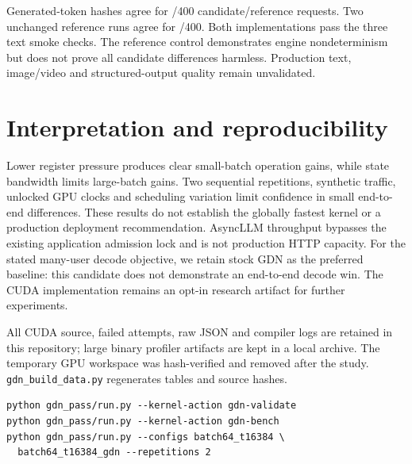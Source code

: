 \documentclass[10pt,a4paper]{article}
\begin{document}
Generated-token hashes agree for \TokenAgree{}/400 candidate/reference requests.
Two unchanged reference runs agree for \ControlAgree{}/400. Both implementations
pass the three text smoke checks. The reference control demonstrates engine
nondeterminism but does not prove all candidate differences harmless. Production
text, image/video and structured-output quality remain unvalidated.

\section{Interpretation and reproducibility}
Lower register pressure produces clear small-batch operation gains, while state
bandwidth limits large-batch gains. Two sequential repetitions, synthetic traffic,
unlocked GPU clocks and scheduling variation limit confidence in small end-to-end
differences. These results do not establish the globally fastest kernel or a
production deployment recommendation. AsyncLLM throughput bypasses the existing
application admission lock and is not production HTTP capacity.
For the stated many-user decode objective, we retain stock GDN as the preferred
baseline: this candidate does not demonstrate an end-to-end decode win. The CUDA
implementation remains an opt-in research artifact for further experiments.

All CUDA source, failed attempts, raw JSON and compiler logs are retained in
this repository; large binary profiler artifacts are kept in a local archive.
The temporary GPU workspace was hash-verified and removed after the study.
\texttt{gdn\_build\_data.py} regenerates tables and source hashes.
\begin{verbatim}
python gdn_pass/run.py --kernel-action gdn-validate
python gdn_pass/run.py --kernel-action gdn-bench
python gdn_pass/run.py --configs batch64_t16384 \
  batch64_t16384_gdn --repetitions 2
\end{verbatim}
\end{document}
